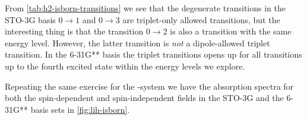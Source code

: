         From \autoref{tab:h2-isborn-transitions} we see that the degenerate
        transitions in the STO-3G basis $0 \to 1$ and $0 \to 3$ are triplet-only
        allowed transitions, but the interesting thing is that the transition $0
        \to 2$ is also a transition with the same energy level.
        However, the latter transition is \emph{not} a dipole-allowed triplet
        transition.
        In the 6-31G** basis the triplet transitions opens up for all
        transitions up to the fourth excited state within the energy levels we
        explore.


        Repeating the same exercise for the -system we have the
        absorption spectra for both the spin-dependent and spin-independent
        fields in the STO-3G and the 6-31G** basis sets in
        \autoref{fig:lih-isborn}.
        \begin{figure}
            \centering
\end{figure}
